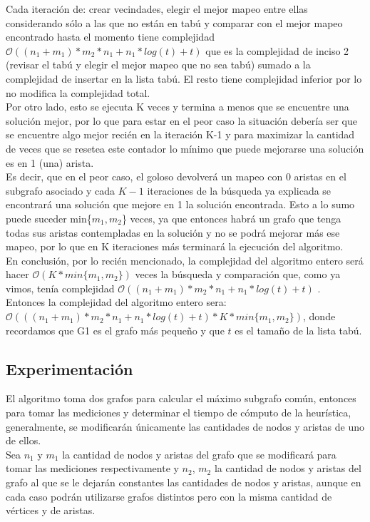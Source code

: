 Cada iteración de: crear vecindades, elegir el mejor mapeo entre ellas considerando sólo a las que no están en tabú y comparar con el mejor mapeo encontrado hasta el momento tiene complejidad $\mathcal{O}((n_1+m_1)*m_2*n_1+n_1*log(t)+t)$ que es la complejidad de inciso 2 (revisar el tabú y elegir el mejor mapeo que no sea tabú) sumado a la complejidad de insertar en la lista tabú. El resto tiene complejidad inferior por lo no modifica la complejidad total.\\
Por otro lado, esto se ejecuta K veces y termina a menos que se encuentre una solución mejor, por lo que para estar en el peor caso la situación debería ser que se encuentre algo mejor recién en la iteración K-1 y para maximizar la cantidad de veces que se resetea este contador lo mínimo que puede mejorarse una solución es en 1 (una) arista.\\
Es decir, que en el peor caso, el goloso devolverá un mapeo con 0 aristas en el subgrafo asociado y cada $K-1$ iteraciones de la búsqueda ya explicada se encontrará una solución que mejore en 1 la solución encontrada. Esto a lo sumo puede suceder min\{$m_1,m_2$\} veces, ya que entonces habrá un grafo que tenga todas sus aristas contempladas en la solución y no se podrá mejorar más ese mapeo, por lo que en K iteraciones más terminará la ejecución del algoritmo.\\
En conclusión, por lo recién mencionado, la complejidad del algoritmo entero será hacer $\mathcal{O}(K* min\{m_1,m_2\})$ veces la búsqueda y comparación que, como ya vimos, tenía complejidad $\mathcal{O}((n_1+m_1)*m_2*n_1+n_1*log(t)+t)$ . \\ 
Entonces la complejidad del algoritmo entero sera:\\
$\mathcal{O}(((n_1+m_1)*m_2*n_1+n_1*log(t)+t)*K* min\{m_1,m_2\})$, donde recordamos que G1 es el grafo más pequeño y que $t$ es el tamaño de la lista tabú.

\subsection{Experimentación}
    \noindent El algoritmo toma dos grafos para calcular el máximo subgrafo común, entonces para tomar las mediciones y determinar el tiempo de cómputo de la heurística, generalmente, se modificarán únicamente las cantidades de nodos y aristas de uno de ellos. \\
Sea $n_1$ y $m_1$ la cantidad de nodos y aristas del grafo que se modificará para tomar las mediciones respectivamente y $n_2$, $m_2$ la cantidad de nodos y aristas del grafo al que se le dejarán constantes las cantidades de nodos y aristas, aunque en cada caso podrán utilizarse grafos distintos pero con la misma cantidad de vértices y de aristas.

